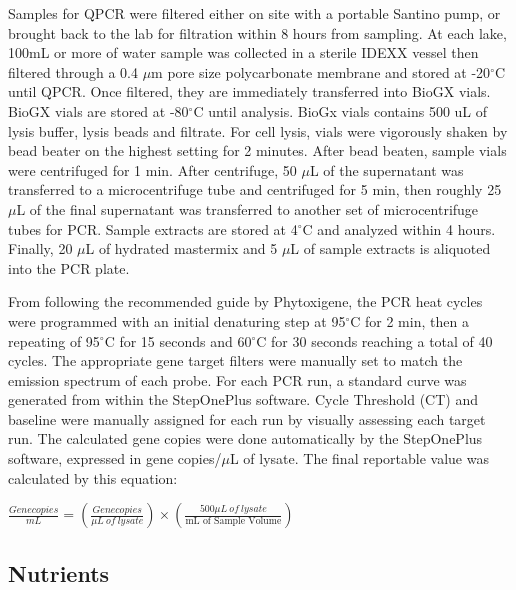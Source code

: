 Samples for QPCR were filtered either on site with a portable Santino pump, or brought back to the lab for filtration within 8 hours from sampling.
At each lake, 100mL or more of water sample was collected in a sterile IDEXX vessel then filtered through a 0.4 $\mu$m pore size polycarbonate membrane  and stored at -20$^\circ$C until QPCR. Once filtered, they are immediately transferred into BioGX vials. BioGX vials are stored at -80$^\circ$C until analysis. BioGx vials contains 500 uL of lysis buffer, lysis beads and filtrate. For cell lysis, vials were vigorously shaken by bead beater on the highest setting for 2 minutes. After bead beaten, sample vials were centrifuged for 1 min. After centrifuge, 50 $\mu$L of the supernatant was transferred to a microcentrifuge tube and centrifuged for 5 min, then roughly 25 $\mu$L of the final supernatant was transferred to another set of microcentrifuge tubes for PCR.  Sample extracts are stored at 4$^\circ$C and analyzed within 4 hours. Finally, 20 $\mu$L of hydrated mastermix and 5 $\mu$L of sample extracts is aliquoted into the PCR plate.

From following the recommended guide by Phytoxigene, the PCR heat cycles were programmed with an initial denaturing step at 95$^\circ$C for 2 min, then a repeating of 95$^\circ$C for 15 seconds and 60$^\circ$C for 30 seconds reaching a total of 40 cycles. The appropriate gene target filters were manually set to match the emission spectrum of each probe. For each PCR run, a standard curve was generated  from within the StepOnePlus software. Cycle Threshold (CT) and baseline were manually assigned for each run by visually assessing each target run. The calculated gene copies were done automatically by the StepOnePlus software, expressed in gene copies/$\mu$L of lysate. The final reportable value was calculated by this equation:

\begin{center}
	$\frac{Genecopies}{mL} = (\frac{Genecopies}{\mu L \: of \: lysate}) \times (\frac{500\mu L \: of \: lysate}{\text{mL of Sample Volume}})$
\end{center}

\subsection{Nutrients}

